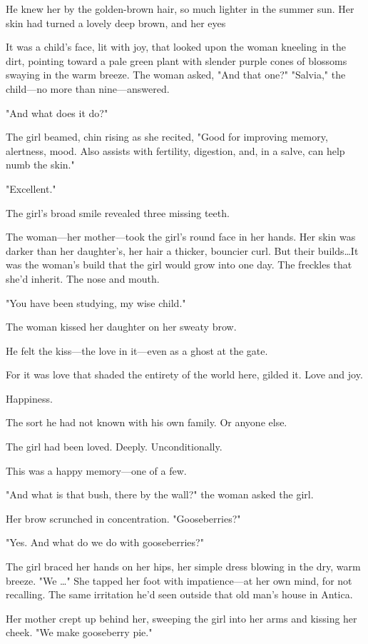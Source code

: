 He knew her by the golden-brown hair, so much lighter in the summer sun.
Her skin had turned a lovely deep brown, and her eyes 

It was a child's face, lit with joy, that looked upon the woman kneeling in the dirt, pointing toward a pale green plant with slender purple cones of blossoms swaying in the warm breeze.
The woman asked, "And that one?"
"Salvia," the child---no more than nine---answered.

"And what does it do?"

The girl beamed, chin rising as she recited, "Good for improving memory, alertness, mood.
Also assists with fertility, digestion, and, in a salve, can help numb the skin."

"Excellent."

The girl's broad smile revealed three missing teeth.

The woman---her mother---took the girl's round face in her hands.
Her skin was darker than her daughter's, her hair a thicker, bouncier curl.
But their builds\ldots It was the woman's build that the girl would grow into one day.
The freckles that she'd inherit.
The nose and mouth.

"You have been studying, my wise child."

The woman kissed her daughter on her sweaty brow.

He felt the kiss---the love in it---even as a ghost at the gate.

For it was love that shaded the entirety of the world here, gilded it.
Love and joy.

Happiness.

The sort he had not known with his own family.
Or anyone else.

The girl had been loved.
Deeply.
Unconditionally.

This was a happy memory---one of a few.

"And what is that bush, there by the wall?"
the woman asked the girl.

Her brow scrunched in concentration.
"Gooseberries?"

"Yes.
And what do we do with gooseberries?"

The girl braced her hands on her hips, her simple dress blowing in the dry, warm breeze.
"We \ldots" She tapped her foot with impatience---at her own mind, for not recalling.
The same irritation he'd seen outside that old man's house in Antica.

Her mother crept up behind her, sweeping the girl into her arms and kissing her cheek.
"We make gooseberry pie."

